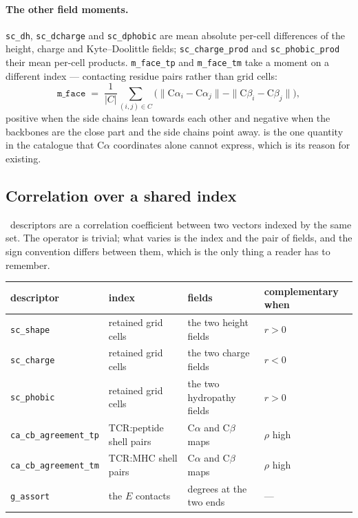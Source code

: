\documentclass[11pt,a4paper]{article}
\newcommand{\dsc}[1]{\texttt{#1}}
\begin{document}
\paragraph{The other field moments.} \dsc{sc\_dh}, \dsc{sc\_dcharge} and \dsc{sc\_dphobic} are mean
absolute per-cell differences of the height, charge and Kyte--Doolittle fields;
\dsc{sc\_charge\_prod} and \dsc{sc\_phobic\_prod} their mean per-cell products.
\dsc{m\_face\_tp} and \dsc{m\_face\_tm} take a moment on a different index --- contacting residue
pairs rather than grid cells:
%
\begin{equation}
\dsc{m\_face} \;=\; \frac{1}{|C|}\sum_{(i,j) \in C}
\big( \| \mathrm{C}\alpha_i - \mathrm{C}\alpha_j \| - \| \mathrm{C}\beta_i - \mathrm{C}\beta_j \| \big),
\label{eq:face}
\end{equation}
%
positive when the side chains lean towards each other and negative when the backbones are the close
part and the side chains point away.  is the one quantity in the catalogue that
C$\alpha$ coordinates alone cannot express, which is its reason for existing.

\subsection{Correlation over a shared index}

\nOpCorrelation\ descriptors are a correlation coefficient between two vectors indexed by the same
set. The operator is trivial; what varies is the index and the pair of fields, and the sign
convention differs between them, which is the only thing a reader has to remember.

\begin{center}\small
\begin{tabular}{@{}lp{}p{}l@{}}
\toprule
descriptor & index & fields & complementary when \\
\midrule
\dsc{sc\_shape}   & retained grid cells & the two height fields    & $r > 0$ \\
\dsc{sc\_charge}  & retained grid cells & the two charge fields    & $r < 0$ \\
\dsc{sc\_phobic}  & retained grid cells & the two hydropathy fields& $r > 0$ \\
\dsc{ca\_cb\_agreement\_tp} & TCR:peptide shell pairs & C$\alpha$ and C$\beta$ maps & $\rho$ high \\
\dsc{ca\_cb\_agreement\_tm} & TCR:MHC shell pairs     & C$\alpha$ and C$\beta$ maps & $\rho$ high \\
\dsc{g\_assort}   & the $E$ contacts    & degrees at the two ends  & --- \\
\bottomrule
\end{tabular}
\end{center}
\end{document}
